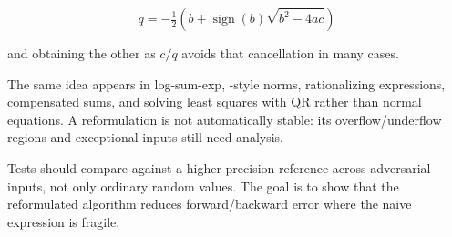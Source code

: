 \[
q=-\tfrac12\left(b+\operatorname{sign}(b)\sqrt{b^2-4ac}\right)
\]

and obtaining the other as \(c/q\) avoids that cancellation in many cases.

The same idea appears in log-sum-exp, -style norms, rationalizing expressions, compensated sums, and solving least squares with QR rather than normal equations. A reformulation is not automatically stable: its overflow/underflow regions and exceptional inputs still need analysis.

Tests should compare against a higher-precision reference across adversarial inputs, not only ordinary random values. The goal is to show that the reformulated algorithm reduces forward/backward error where the naive expression is fragile.
